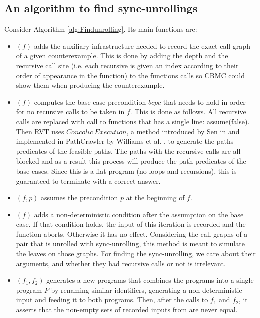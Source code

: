 \subsection{An algorithm to find sync-unrollings} \label{sec:findsyncunrolling}
Consider Algorithm \ref{alg:Findunrolling}. Its main functions are: 
\begin{itemize}
    \item {}$(f)$ adds the auxiliary infrastructure needed to record the exact call graph of a given counterexample. This is done by adding the depth and the recursive call site (i.e. each recursive is given an index according to their order of appearance in the function) to the functions calls so CBMC could show them when producing the counterexample.
    \item {}$(f)$ computes the base case precondition $bcpc$ that needs to hold in order for no recursive calls to be taken in $f$. This is done as follows. All recursive calls are replaced with call to  functions that has a single line: assume(false). Then RVT uses $Concolic\ Execution$, a method introduced by Sen in \cite{10.1145/1321631.1321746} and implemented in PathCrawler  by Williams et al. \cite{10.1007/11408901_21}, to generate the paths predicates of the feasible paths. The paths with the recursive calls are all blocked and as a result this process will produce the path predicates of the base cases. Since this is a flat program (no loops and recursions), this is guaranteed to terminate with a correct answer.
    \item {}$(f,p)$ assumes the precondition $p$ at the beginning of $f$. 
    \item {}$(f)$ adds a non-deterministic condition after the assumption on the base case. If that condition holds, the input of this iteration is recorded and the function aborts. Otherwise it has no effect. Considering the call graphs of a pair that is unrolled with sync-unrolling, this method is meant to simulate the leaves on those graphs. For finding the sync-unrolling, we care about their arguments, and whether they had recursive calls or not is irrelevant.
    \item {}$(f_1,f_2)$ generates a new programs that combines the programs into a single program $P$ by renaming similar identifiers, generating a non deterministic input and feeding it to both programs. Then, after the calls to $f_1$ and $f_2$, it asserts that the non-empty sets of recorded inputs from  are never equal.

\end{itemize}
